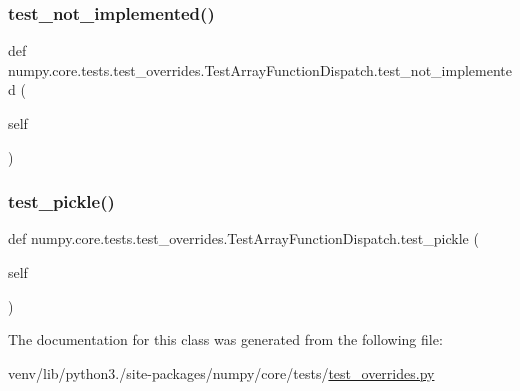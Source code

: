 \subsubsection{\texorpdfstring{test\+\_\+not\+\_\+implemented()}{test\_not\_implemented()}}
{\footnotesize\ttfamily def numpy.\+core.\+tests.\+test\+\_\+overrides.\+Test\+Array\+Function\+Dispatch.\+test\+\_\+not\+\_\+implemented (\begin{DoxyParamCaption}\item[{}]{self }\end{DoxyParamCaption})}

\mbox{\label{classnumpy_1_1core_1_1tests_1_1test__overrides_1_1TestArrayFunctionDispatch_ac3090e7a47c3bb2ae9b234714085d03e}} 
\subsubsection{\texorpdfstring{test\+\_\+pickle()}{test\_pickle()}}
{\footnotesize\ttfamily def numpy.\+core.\+tests.\+test\+\_\+overrides.\+Test\+Array\+Function\+Dispatch.\+test\+\_\+pickle (\begin{DoxyParamCaption}\item[{}]{self }\end{DoxyParamCaption})}



The documentation for this class was generated from the following file\+:\begin{DoxyCompactItemize}
\item 
venv/lib/python3./site-\/packages/numpy/core/tests/\hyperlink{test__overrides_8py}{test\+\_\+overrides.\+py}\end{DoxyCompactItemize}
